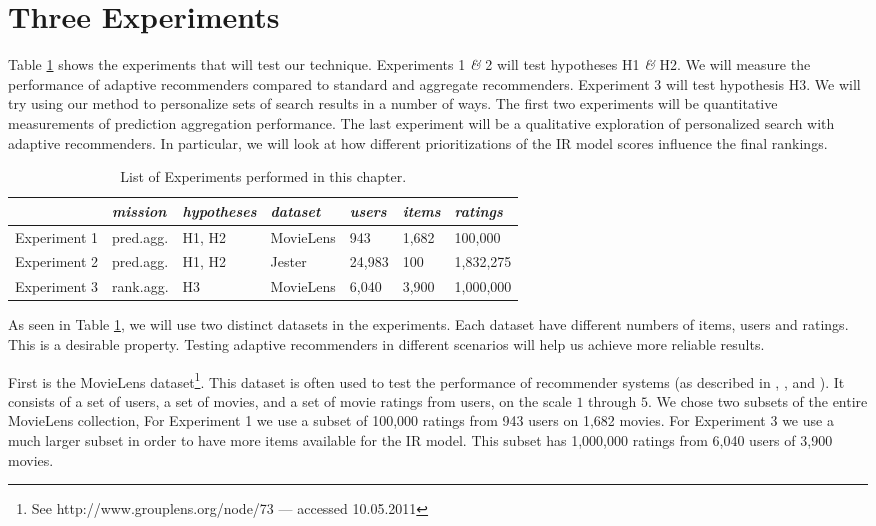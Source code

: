 \section{Three Experiments}

Table \ref{table:experiments} shows the experiments that will test our technique.
Experiments 1 \emph{\&} 2 will test hypotheses H1 \emph{\&} H2.
We will measure the performance of adaptive recommenders compared to standard and aggregate recommenders.
Experiment 3 will test hypothesis H3.
We will try using our method to personalize sets of search results in a number of ways.
The first two experiments will be quantitative measurements of prediction aggregation performance.
The last experiment will be a qualitative exploration of personalized search with adaptive recommenders.
In particular, we will look at how different prioritizations of the IR model scores influence the final rankings.

\vspace{1em}
\begin{table}[h]
  \begin{tabular*}{\textwidth}{ l l l l l l l }
    \toprule
      ~ & 
      \emph{mission} &
      \emph{hypotheses} &
      \emph{dataset} &
      \emph{users} &
      \emph{items} &
      \emph{ratings} \\
    \midrule
    
    Experiment 1 &
    pred.agg. &
    H1, H2 &
    MovieLens &
    943 &
    1,682 &
    100,000 \\
    
    Experiment 2 &
    pred.agg. &
    H1, H2 &
    Jester &
    24,983 &
    100 &
    1,832,275 \\

    Experiment 3 &
    rank.agg. &
    H3 &
    MovieLens &
    6,040 &
    3,900 &
    1,000,000 \\
    
    \bottomrule 
  \end{tabular*}
  \caption[List of Experiments]{List of Experiments performed in this chapter.}
  \label{table:experiments}
\end{table}

\noindent
As seen in Table \ref{table:experiments}, 
we will use two distinct datasets in the experiments.
Each dataset have different numbers of items, users and ratings.
This is a desirable property.
Testing adaptive recommenders in different scenarios
will help us achieve more reliable results.

First is the MovieLens dataset\footnote{
See http://www.grouplens.org/node/73 --- accessed 10.05.2011}.
This dataset is often used to test the performance of recommender systems
(as described in 
\citet[p.9]{Alshamri2008}, \citet[p.4]{Lemire2005}, \citet[p.1]{Adomavicius2005} and \citet[p.2]{Herlocker2004}).
It consists of a set of users, a set of movies, and a set of movie ratings from users,
on the scale $1$ through $5$.
We chose two subsets of the entire MovieLens collection, 
For Experiment 1 we use a subset of 100,000 ratings from 943 users on 1,682 movies.
For Experiment 3 we use a much larger subset in order to
have more items available for the IR model.
This subset has 1,000,000 ratings from 6,040 users of 3,900 movies.

